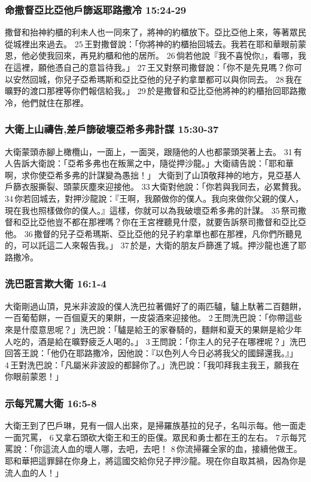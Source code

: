 \subsubsection{命撒督亞比亞他戶篩返耶路撒冷 15:24-29}
撒督和抬神約櫃的利未人也一同來了，將神的約櫃放下。亞比亞他上來，等著眾民從城裡出來過去。 25 王對撒督說：「你將神的約櫃抬回城去。我若在耶和華眼前蒙恩，他必使我回來，再見約櫃和他的居所。 26 倘若他說『我不喜悅你』，看哪，我在這裡，願他憑自己的意旨待我。」 27 王又對祭司撒督說：「你不是先見嗎？你可以安然回城，你兒子亞希瑪斯和亞比亞他的兒子約拿單都可以與你同去。 28 我在曠野的渡口那裡等你們報信給我。」 29 於是撒督和亞比亞他將神的約櫃抬回耶路撒冷，他們就住在那裡。

\subsubsection{大衛上山禱告,差戶篩破壞亞希多弗計謀 15:30-37}
大衛蒙頭赤腳上橄欖山，一面上，一面哭，跟隨他的人也都蒙頭哭著上去。 31 有人告訴大衛說：「亞希多弗也在叛黨之中，隨從押沙龍。」大衛禱告說：「耶和華啊，求你使亞希多弗的計謀變為愚拙！」
大衛到了山頂敬拜神的地方，見亞基人戶篩衣服撕裂、頭蒙灰塵來迎接他。 33 大衛對他說：「你若與我同去，必累贅我。 34 你若回城去，對押沙龍說：『王啊，我願做你的僕人。我向來做你父親的僕人，現在我也照樣做你的僕人。』這樣，你就可以為我破壞亞希多弗的計謀。 35 祭司撒督和亞比亞他豈不都在那裡嗎？你在王宮裡聽見什麼，就要告訴祭司撒督和亞比亞他。 36 撒督的兒子亞希瑪斯、亞比亞他的兒子約拿單也都在那裡，凡你們所聽見的，可以託這二人來報告我。」 37 於是，大衛的朋友戶篩進了城。押沙龍也進了耶路撒冷。

\subsubsection{洗巴誑言欺大衛 16:1-4}
大衛剛過山頂，見米非波設的僕人洗巴拉著備好了的兩匹驢，驢上馱著二百麵餅，一百葡萄餅，一百個夏天的果餅，一皮袋酒來迎接他。 2 王問洗巴說：「你帶這些來是什麼意思呢？」洗巴說：「驢是給王的家眷騎的，麵餅和夏天的果餅是給少年人吃的，酒是給在曠野疲乏人喝的。」 3 王問說：「你主人的兒子在哪裡呢？」洗巴回答王說：「他仍在耶路撒冷，因他說：『以色列人今日必將我父的國歸還我。』」 4 王對洗巴說：「凡屬米非波設的都歸你了。」洗巴說：「我叩拜我主我王，願我在你眼前蒙恩！」

\subsubsection{示每咒罵大衛 16:5-8}
大衛王到了巴戶琳，見有一個人出來，是掃羅族基拉的兒子，名叫示每。他一面走一面咒罵， 6 又拿石頭砍大衛王和王的臣僕。眾民和勇士都在王的左右。 7 示每咒罵說：「你這流人血的壞人哪，去吧，去吧！ 8 你流掃羅全家的血，接續他做王。耶和華把這罪歸在你身上，將這國交給你兒子押沙龍。現在你自取其禍，因為你是流人血的人！」

